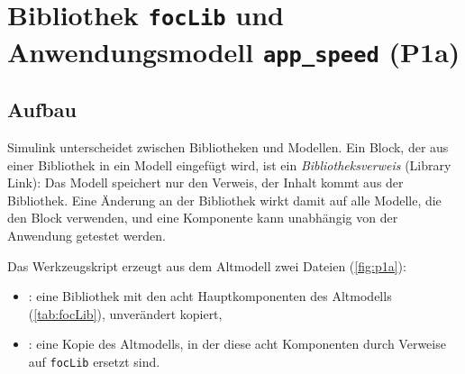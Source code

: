 \section{Bibliothek \texttt{focLib} und Anwendungsmodell \texttt{app\_speed} (P1a)}
\label{sec:p1a}

\subsection{Aufbau}

Simulink unterscheidet zwischen Bibliotheken und Modellen. Ein Block, der aus einer
Bibliothek in ein Modell eingefügt wird, ist ein \emph{Bibliotheksverweis} (Library Link):
Das Modell speichert nur den Verweis, der Inhalt kommt aus der Bibliothek. Eine Änderung an
der Bibliothek wirkt damit auf alle Modelle, die den Block verwenden, und eine Komponente kann
unabhängig von der Anwendung getestet werden.

Das Werkzeugskript  erzeugt aus dem Altmodell zwei Dateien
(\cref{fig:p1a}):

\begin{itemize}
  \item {}: eine Bibliothek mit den acht Hauptkomponenten des Altmodells
    (\cref{tab:focLib}), unverändert kopiert,
  \item {}: eine Kopie des Altmodells, in der diese acht Komponenten
    durch Verweise auf \texttt{focLib} ersetzt sind.
\end{itemize}

